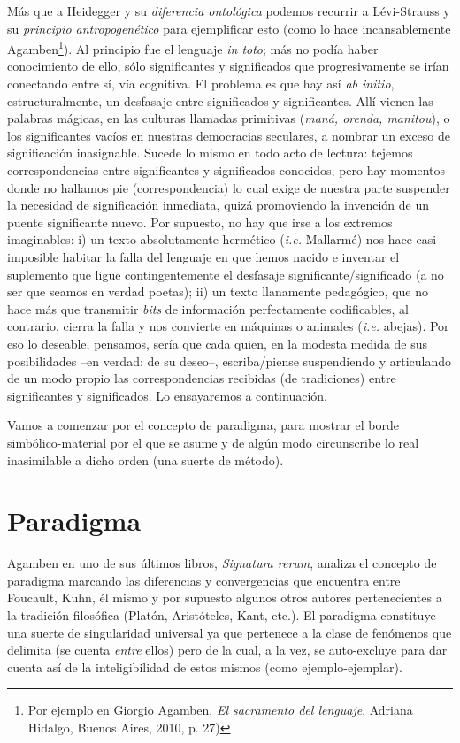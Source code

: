 Más que a Heidegger y su \emph{diferencia ontológica} podemos recurrir a Lévi-Strauss y su \emph{principio antropogenético} para ejemplificar esto (como lo hace incansablemente Agamben\footnote{Por ejemplo en Giorgio Agamben, \emph{El sacramento del lenguaje}, Adriana Hidalgo, Buenos Aires, 2010, p. 27)}). Al principio fue el lenguaje \emph{in toto}; más no podía haber conocimiento de ello, sólo significantes y significados que progresivamente se irían conectando entre sí, vía cognitiva. El problema es que hay así \emph{ab initio}, estructuralmente, un desfasaje entre significados y significantes. Allí vienen las palabras mágicas, en las culturas llamadas primitivas (\emph{maná, orenda, manitou}), o los significantes vacíos en nuestras democracias seculares, a nombrar un exceso de significación inasignable. Sucede lo mismo en todo acto de lectura: tejemos correspondencias entre significantes y significados conocidos, pero hay momentos donde no hallamos pie (correspondencia) lo cual exige de nuestra parte suspender la necesidad de significación inmediata, quizá promoviendo la invención de un puente significante nuevo. Por supuesto, no hay que irse a los extremos imaginables: i) un texto absolutamente hermético (\emph{i.e.} Mallarmé) nos hace casi imposible habitar la falla del lenguaje en que hemos nacido e inventar el suplemento que ligue contingentemente el desfasaje significante/significado (a no ser que seamos en verdad poetas); ii) un texto llanamente pedagógico, que no hace más que transmitir \emph{bits} de información perfectamente codificables, al contrario, cierra la falla y nos convierte en máquinas o animales (\emph{i.e.} abejas). Por eso lo deseable, pensamos, sería que cada quien, en la modesta medida de sus posibilidades --en verdad: de su deseo--, escriba/piense suspendiendo y articulando de un modo propio las correspondencias recibidas (de tradiciones) entre significantes y significados. Lo ensayaremos a continuación.

Vamos a comenzar por el concepto de paradigma, para mostrar el borde simbólico-material por el que se asume y de algún modo circunscribe lo real inasimilable a dicho orden (una suerte de método).

\section{Paradigma}

Agamben en uno de sus últimos libros, \emph{Signatura rerum}, analiza el concepto de paradigma marcando las diferencias y convergencias que encuentra entre Foucault, Kuhn, él mismo y por supuesto algunos otros autores pertenecientes a la tradición filosófica (Platón, Aristóteles, Kant, etc.). El paradigma constituye una suerte de singularidad universal ya que pertenece a la clase de fenómenos que delimita (se cuenta \emph{entre} ellos) pero de la cual, a la vez, se auto-excluye para dar cuenta así de la inteligibilidad de estos mismos (como ejemplo-ejemplar).

